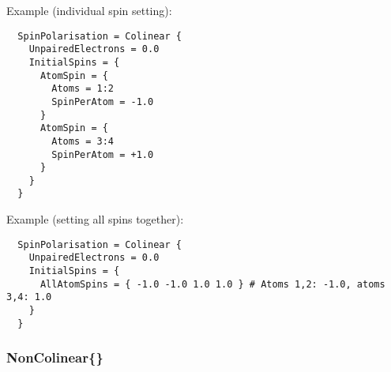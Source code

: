 \begin{description}
Example (individual spin setting):
\invparskip
\begin{verbatim}
  SpinPolarisation = Colinear {
    UnpairedElectrons = 0.0
    InitialSpins = {
      AtomSpin = {
        Atoms = 1:2
        SpinPerAtom = -1.0
      }
      AtomSpin = {
        Atoms = 3:4
        SpinPerAtom = +1.0
      }
    }
  }
\end{verbatim}

Example (setting all spins together):
\invparskip
\begin{verbatim}
  SpinPolarisation = Colinear {
    UnpairedElectrons = 0.0
    InitialSpins = {
      AllAtomSpins = { -1.0 -1.0 1.0 1.0 } # Atoms 1,2: -1.0, atoms 3,4: 1.0
    }
  }
\end{verbatim}
\end{description}

\subsubsection{NonColinear\{\}}
\label{sec:dftbp.NonColinear}


